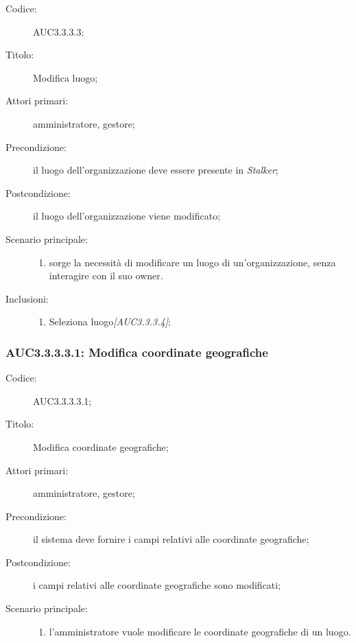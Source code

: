 \documentclass[../../../analisi-dei-requisiti.tex]{subfiles}
\begin{document}
\begin{description}
  \item[Codice:] AUC3.3.3.3;
  \item[Titolo:] Modifica luogo;
  \item[Attori primari:] amministratore, gestore;
  \item[Precondizione:] il luogo dell'organizzazione deve essere presente in \emph{Stalker};
  \item[Postcondizione:] il luogo dell'organizzazione viene modificato;
  \item[Scenario principale:]
  \begin{enumerate}
    \item sorge la necessità di modificare un luogo di un'organizzazione, senza interagire con il suo owner.
  \end{enumerate}
  \item[Inclusioni:]
  \begin{enumerate}
    \item Seleziona luogo\emph{[AUC3.3.3.4]};
  \end{enumerate}
\end{description}

\subsubsection{AUC3.3.3.3.1: Modifica coordinate geografiche}%
\label{subs:AUC3.3.3.3.1}
\begin{description}
  \item[Codice:] AUC3.3.3.3.1;
  \item[Titolo:] Modifica coordinate geografiche;
  \item[Attori primari:] amministratore, gestore;
  \item[Precondizione:] il sistema deve fornire i campi relativi alle coordinate geografiche;
  \item[Postcondizione:] i campi relativi alle coordinate geografiche sono modificati;
  \item[Scenario principale:]
  \begin{enumerate}
    \item l'amministratore vuole modificare le coordinate geografiche di un luogo.
  \end{enumerate}
\end{description}
\end{document}
